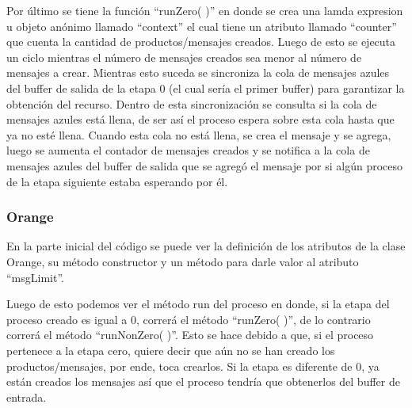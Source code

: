 \documentclass[a4paper]{article}
\begin{document}
        Por último se tiene la función “runZero( )” en donde se crea una lamda expresion u objeto anónimo llamado “context” el cual tiene un atributo llamado “counter” que cuenta la cantidad de productos/mensajes creados. Luego de esto se ejecuta un ciclo mientras el número de mensajes creados sea menor al número de mensajes a crear. Mientras esto suceda se sincroniza la cola de mensajes azules del buffer de salida de la etapa 0 (el cual sería el primer buffer) para garantizar la obtención del recurso. Dentro de esta sincronización se consulta si la cola de mensajes azules está llena, de ser así el proceso espera sobre esta cola hasta que ya no esté llena. Cuando esta cola no está llena, se crea el mensaje y se agrega, luego se aumenta el contador de mensajes creados y se notifica a la cola de mensajes azules del buffer de salida que se agregó el mensaje por si algún proceso de la etapa siguiente estaba esperando por él. 
        
        \subsubsection{Orange}
        En la parte inicial del código se puede ver la definición de los atributos de la clase Orange, su método constructor y un método para darle valor al atributo “msgLimit”. 

        Luego de esto podemos ver el método run del proceso en donde, si la etapa del proceso creado es igual a 0, correrá el método “runZero( )”, de lo contrario correrá el método “runNonZero( )”. Esto se hace debido a que, si el proceso pertenece a la etapa cero, quiere decir que aún no se han creado los productos/mensajes, por ende, toca crearlos. Si la etapa es diferente de 0, ya están creados los mensajes así que el proceso tendría que obtenerlos del buffer de entrada. 
\end{document}
